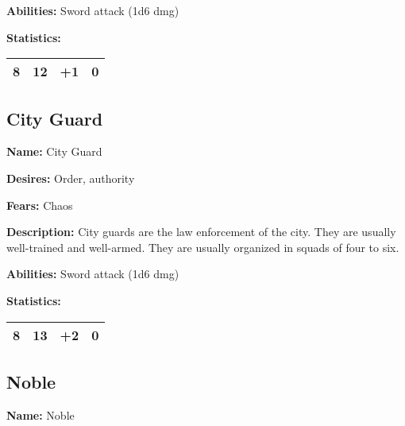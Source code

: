 \begin{multicols}{2}
\textbf{Abilities:} Sword attack (1d6 dmg)

\textbf{Statistics:}

\begin{center}
{
\begin{xtabular}{|l|l|l|l|}
8 & 12 & +1 & 0 \\
\hline
\end{xtabular}
}
\end{center}

\subsection{City Guard}

\textbf{Name:} City Guard

\textbf{Desires:} Order, authority

\textbf{Fears:} Chaos

\textbf{Description:} City guards are the law enforcement of the city. They are usually
well-trained and well-armed. They are usually organized in squads of four to six.

\textbf{Abilities:} Sword attack (1d6 dmg)

\textbf{Statistics:}

\begin{center}
{
\begin{xtabular}{|l|l|l|l|}
8 & 13 & +2 & 0 \\
\hline
\end{xtabular}
}
\end{center}

\subsection{Noble}

\textbf{Name:} Noble


\end{multicols}
